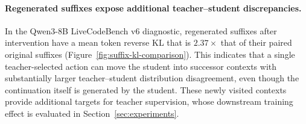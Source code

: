 \vspace{-0.1cm}\paragraph{Regenerated suffixes expose additional teacher--student discrepancies.}
In the Qwen3-8B LiveCodeBench v6 diagnostic, regenerated suffixes after intervention have a mean token reverse KL that is $2.37\times$ that of their paired original suffixes (Figure~\ref{fig:suffix-kl-comparison}). This indicates that a single teacher-selected action can move the student into successor contexts with substantially larger teacher--student distribution disagreement, even though the continuation itself is generated by the student. These newly visited contexts provide additional targets for teacher supervision, whose downstream training effect is evaluated in Section~\ref{sec:experiments}.
















































































